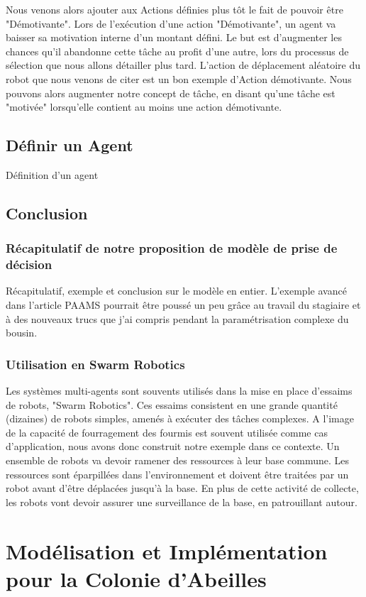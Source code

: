 \documentclass[11pt,a4paper]{report}
\begin{document}
			Nous venons alors ajouter aux Actions définies plus tôt le fait de pouvoir être "Démotivante". Lors de l'exécution d'une action "Démotivante", un agent va baisser sa motivation interne d'un montant défini. Le but est d'augmenter les chances qu'il abandonne cette tâche au profit d'une autre, lors du processus de sélection que nous allons détailler plus tard. L'action de déplacement aléatoire du robot que nous venons de citer est un bon exemple d'Action démotivante. Nous pouvons alors augmenter notre concept de tâche, en disant qu'une tâche est "motivée" lorsqu'elle contient au moins une action démotivante.
	
	\section{Définir un Agent}
		Définition d'un agent
		
	\section*{Conclusion}
		\subsection{Récapitulatif de notre proposition de modèle de prise de décision}
		Récapitulatif, exemple et conclusion sur le modèle en entier.
		L'exemple avancé dans l'article PAAMS pourrait être poussé un peu grâce au travail du stagiaire et à des nouveaux trucs que j'ai compris pendant la paramétrisation complexe du bousin.
		
		\subsection{Utilisation en Swarm Robotics}
			Les systèmes multi-agents sont souvents utilisés dans la mise en place d'essaims de robots, "Swarm Robotics". Ces essaims consistent en une grande quantité (dizaines) de robots simples, amenés à exécuter des tâches complexes. A l'image de la capacité de fourragement des fourmis est souvent utilisée comme cas d'application, nous avons donc construit notre exemple dans ce contexte. Un ensemble de robots va devoir ramener des ressources à leur base commune. Les ressources sont éparpillées dans l'environnement et doivent être traitées par un robot avant d'être déplacées jusqu'à la base. En plus de cette activité de collecte, les robots vont devoir assurer une surveillance de la base, en patrouillant autour.

\chapter{Modélisation et Implémentation pour la Colonie d'Abeilles}
\end{document}
